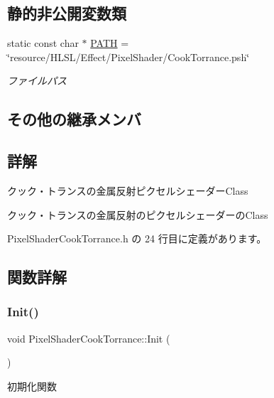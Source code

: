 \subsection*{静的非公開変数類}
\begin{DoxyCompactItemize}
\item 
static const char $\ast$ \mbox{\hyperlink{class_pixel_shader_cook_torrance_a15a4b3e226f5c33dffe0d0679dd40134}{P\+A\+TH}} = \char`\"{}resource/H\+L\+SL/Effect/Pixel\+Shader/Cook\+Torrance.\+psh\char`\"{}
\begin{DoxyCompactList}\small\item\em ファイルパス \end{DoxyCompactList}\end{DoxyCompactItemize}
\subsection*{その他の継承メンバ}


\subsection{詳解}
クック・トランスの金属反射ピクセルシェーダー\+Class 

クック・トランスの金属反射のピクセルシェーダーの\+Class 

 Pixel\+Shader\+Cook\+Torrance.\+h の 24 行目に定義があります。



\subsection{関数詳解}
\mbox{\label{class_pixel_shader_cook_torrance_aed6d21d6560d11fede08e596f49716d5}} 
\subsubsection{\texorpdfstring{Init()}{Init()}}
{\footnotesize\ttfamily void Pixel\+Shader\+Cook\+Torrance\+::\+Init (\begin{DoxyParamCaption}{ }\end{DoxyParamCaption})\hspace{0.3cm}{\ttfamily [virtual]}}



初期化関数 


